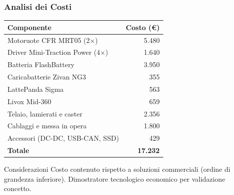 \begin{frame}
    \frametitle{Analisi dei Costi}
    \begin{table}[htbp]
        \centering
        \small
        \begin{tabular}{|l|r|}
            \hline
            \textbf{Componente}             & \textbf{Costo (€)} \\
            \hline
            Motoruote CFR MRT05 (2×)        & 5.480              \\
            Driver Mini-Traction Power (4×) & 1.640              \\
            Batteria FlashBattery           & 3.950              \\
            Caricabatterie Zivan NG3        & 355                \\
            LattePanda Sigma                & 563                \\
            Livox Mid-360                   & 659                \\
            Telaio, lamierati e caster      & 2.356              \\
            Cablaggi e messa in opera       & 1.800              \\
            Accessori (DC-DC, USB-CAN, SSD) & 429                \\
            \hline
            \textbf{Totale}                 & \textbf{17.232}    \\
            \hline
        \end{tabular}
    \end{table}

    \vspace{0.3cm}
    \begin{block}{Considerazioni}
        Costo contenuto rispetto a soluzioni commerciali (ordine di grandezza inferiore). Dimostratore tecnologico economico per validazione concetto.
    \end{block}
\end{frame}
